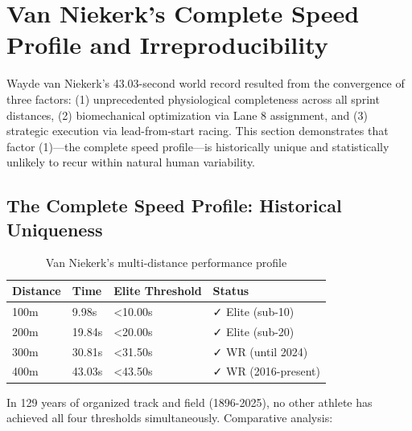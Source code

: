 \section{Van Niekerk's Complete Speed Profile and Irreproducibility}

Wayde van Niekerk's 43.03-second world record resulted from the convergence of three factors: (1) unprecedented physiological completeness across all sprint distances, (2) biomechanical optimization via Lane 8 assignment, and (3) strategic execution via lead-from-start racing. This section demonstrates that factor (1)—the complete speed profile—is historically unique and statistically unlikely to recur within natural human variability.

\subsection{The Complete Speed Profile: Historical Uniqueness}

\begin{table}[H]
\centering
\caption{Van Niekerk's multi-distance performance profile}
\begin{tabular}{@{}llll@{}}
\toprule
\textbf{Distance} & \textbf{Time} & \textbf{Elite Threshold} & \textbf{Status} \\
\midrule
100m & 9.98s & <10.00s & ✓ Elite (sub-10) \\
200m & 19.84s & <20.00s & ✓ Elite (sub-20) \\
300m & 30.81s & <31.50s & ✓ WR (until 2024) \\
400m & 43.03s & <43.50s & ✓ WR (2016-present) \\
\bottomrule
\end{tabular}
\end{table}

In 129 years of organized track and field (1896-2025), no other athlete has achieved all four thresholds simultaneously. Comparative analysis:

